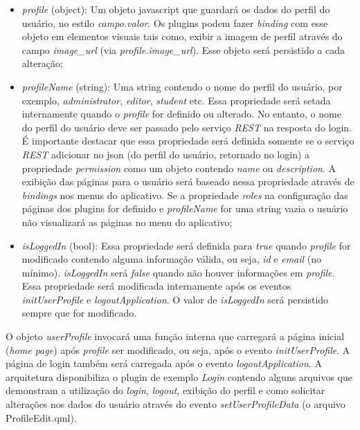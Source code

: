 \begin{itemize}
	\item \textit{profile} (object): Um objeto javascript que guardará os dados do perfil do usuário, no estilo \textit{campo.valor}. Os plugins podem fazer \textit{binding} com esse objeto em elementos visuais tais como, exibir a imagem de perfil através do campo \textit{image\_url} (via \textit{profile.image\_url}). Esse objeto será persistido a cada alteração;

	\item \textit{profileName} (string): Uma string contendo o nome do perfil do usuário, por exemplo, \textit{administrator}, \textit{editor}, \textit{student} etc. Essa propriedade será setada internamente quando o \textit{profile} for definido ou alterado. No entanto, o nome do perfil do usuário deve ser passado pelo serviço \textit{REST} na resposta do login. É importante destacar que essa propriedade será definida somente se o serviço \textit{REST} adicionar no json (do perfil do usuário, retornado no login) a propriedade \textit{permission} como um objeto contendo \textit{name} ou \textit{description}. A exibição das páginas para o usuário será baseado nessa propriedade através de \textit{bindings} nos menus do aplicativo. Se a propriedade \textit{roles} na configuração das páginas dos plugins for definido e \textit{profileName} for uma string vazia o usuário não visualizará as páginas no menu do aplicativo;

	\item \textit{isLoggedIn} (bool): Essa propriedade será definida para \textit{true} quando \textit{profile} for modificado contendo alguma informação válida, ou seja, \textit{id} e \textit{email} (no mínimo). \textit{isLoggedIn} será \textit{false} quando não houver informações em \textit{profile}. Essa propriedade será modificada internamente após os eventos \textit{initUserProfile} e \textit{logoutApplication}. O valor de \textit{isLoggedIn} será persistido sempre que for modificado.
\end{itemize}

O objeto \textit{userProfile} invocará uma função interna que carregará a página inicial (\textit{home page}) após \textit{profile} ser modificado, ou seja, após o evento \textit{initUserProfile}. A página de login também será carregada após o evento \textit{logoutApplication}. A arquitetura disponibiliza o plugin de exemplo \textit{Login} contendo alguns arquivos que demonstram a utilização do \textit{login}, \textit{logout}, exibição do perfil e como solicitar alterações nos dados do usuário através do evento \textit{setUserProfileData} (o arquivo ProfileEdit.qml).\par

